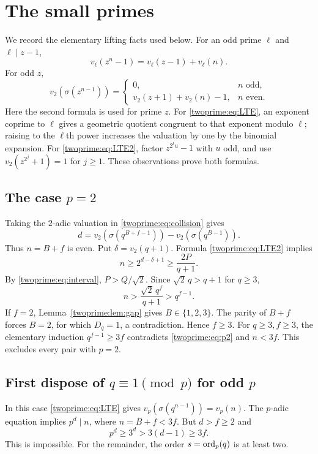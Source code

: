 \section{The small primes}
We record the elementary lifting facts used below. For an odd prime $\ell$ and $\ell\mid z-1$,
\begin{equation}\label{twoprime:eq:LTE}
 v_\ell(z^n-1)=v_\ell(z-1)+v_\ell(n).
\end{equation}
For odd $z$,
\begin{equation}\label{twoprime:eq:LTE2}
 v_2(\sigma(z^{n-1}))=
 \begin{cases}
 0,&n\text{ odd},\\
 v_2(z+1)+v_2(n)-1,&n\text{ even}.
 \end{cases}
\end{equation}
Here the second formula is used for prime $z$. For \eqref{twoprime:eq:LTE}, an exponent coprime to $\ell$ gives a geometric quotient congruent to that exponent modulo $\ell$; raising to the $\ell$th power increases the valuation by one by the binomial expansion. For \eqref{twoprime:eq:LTE2}, factor $z^{2^t u}-1$ with $u$ odd, and use $v_2(z^{2^j}+1)=1$ for $j\ge1$. These observations prove both formulas.

\subsection*{The case $p=2$}
Taking the $2$-adic valuation in \eqref{twoprime:eq:collision} gives
\[
 d=v_2(\sigma(q^{B+f-1}))-v_2(\sigma(q^{B-1})).
\]
Thus $n=B+f$ is even. Put $\delta=v_2(q+1)$. Formula \eqref{twoprime:eq:LTE2} implies
\[
 n\ge2^{d-\delta+1}\ge\frac{2P}{q+1}.
\]
By \eqref{twoprime:eq:interval}, $P>Q/\sqrt2$. Since $\sqrt2\,q>q+1$ for $q\ge3$,
\begin{equation}\label{twoprime:eq:p2}
 n>\frac{\sqrt2\,q^f}{q+1}>q^{f-1}.
\end{equation}
If $f=2$, Lemma~\ref{twoprime:lem:gap} gives $B\in\{1,2,3\}$. The parity of $B+f$ forces $B=2$, for which $D_q=1$, a contradiction. Hence $f\ge3$. For $q\ge3,f\ge3$, the elementary induction $q^{f-1}\ge3f$ contradicts \eqref{twoprime:eq:p2} and $n<3f$. This excludes every pair with $p=2$.

\subsection*{First dispose of $q\equiv1\pmod p$ for odd $p$}
In this case \eqref{twoprime:eq:LTE} gives $v_p(\sigma(q^{n-1}))=v_p(n)$. The $p$-adic equation implies $p^d\mid n$, where $n=B+f<3f$. But $d>f\ge2$ and
\[
 p^d\ge3^d>3(d-1)\ge3f.
\]
This is impossible. For the remainder, the order $s=\operatorname{ord}_p(q)$ is at least two.

